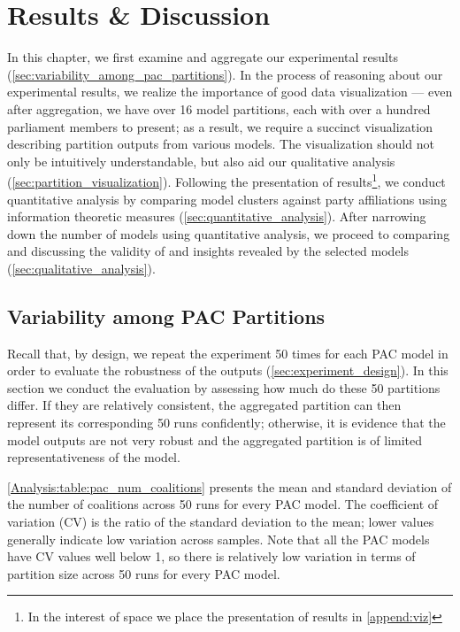 
\chapter{Results \& Discussion}
\label{ch:analysis}

In this chapter, we first examine and aggregate our experimental results
(\autoref{sec:variability_among_pac_partitions}).
In the process of reasoning about our experimental results, we realize the
importance of good data visualization --- even after aggregation, we have over
16 model partitions, each with over a hundred parliament members to present;
as a result, we require a succinct visualization describing partition outputs
from various models.
The visualization should not only be intuitively understandable, but also aid
our qualitative analysis (\autoref{sec:partition_visualization}).
Following the presentation of results\footnote{In the interest of space we
place the presentation of results in \autoref{append:viz}}, we conduct
quantitative analysis by comparing model clusters against party affiliations
using information theoretic measures (\autoref{sec:quantitative_analysis}).
After narrowing down the number of models using quantitative analysis, we
proceed to comparing and discussing the validity of and insights revealed by
the selected models (\autoref{sec:qualitative_analysis}).


\section{Variability among PAC Partitions}
\label{sec:variability_among_pac_partitions}
Recall that, by design, we repeat the experiment 50 times for each PAC model
in order to evaluate the robustness of the outputs (\autoref{sec:experiment_design}).
In this section we conduct the evaluation by assessing how much do these 50
partitions differ.
If they are relatively consistent, the aggregated partition can then represent
its corresponding 50 runs confidently; otherwise, it is evidence that the model
outputs are not very robust and the aggregated partition is of limited
representativeness of the model.

\autoref{Analysis:table:pac_num_coalitions} presents the mean and standard
deviation of the number of coalitions across 50 runs for every PAC model.
The coefficient of variation (CV) is the ratio of the standard deviation to
the mean; lower values generally indicate low variation across samples.
Note that all the PAC models have CV values well below 1, so there is relatively
low variation in terms of partition size across 50 runs for every PAC model.

